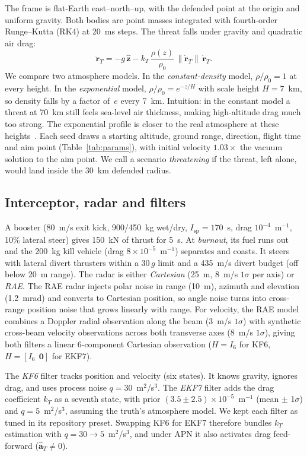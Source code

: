 \documentclass[conference,letterpaper]{IEEEtran}
\newcommand{\vect}[1]{\mathbf{#1}}
\begin{document}
The frame is flat-Earth east--north--up, with the defended point at the origin and uniform gravity.
Both bodies are point masses integrated with fourth-order Runge--Kutta (RK4) at 20~ms steps.
The threat falls under gravity and quadratic air drag:
\begin{equation}
\ddot{\vect r}_T = -g\,\hat{\vect z} - k_T\,\frac{\rho(z)}{\rho_0}\,\lVert\dot{\vect r}_T\rVert\,\dot{\vect r}_T .
\label{eq:threat}
\end{equation}
We compare two atmosphere models.
In the \emph{constant-density} model, $\rho/\rho_0 = 1$ at every height.
In the \emph{exponential} model, $\rho/\rho_0 = e^{-z/H}$ with scale height $H = 7$~km, so density falls by a factor of~$e$ every 7~km.
Intuition: in the constant model a threat at 70~km still feels sea-level air thickness, making high-altitude drag much too strong.
The exponential profile is closer to the real atmosphere at these heights~\cite{ussa1976}.
Each seed draws a starting altitude, ground range, direction, flight time and aim point (Table~\ref{tab:params}), with initial velocity $1.03\times$ the vacuum solution to the aim point.
We call a scenario \emph{threatening} if the threat, left alone, would land inside the 30~km defended radius.

\subsection{Interceptor, radar and filters}

A booster (80~m/s exit kick, 900/450~kg wet/dry, $I_{\mathrm{sp}} = 170$~s, drag $10^{-4}$~m$^{-1}$, 10\% lateral steer) gives 150~kN of thrust for 5~s.
At \emph{burnout}, its fuel runs out and the 200~kg kill vehicle (drag $8\times10^{-5}$~m$^{-1}$) separates and coasts.
It steers with lateral divert thrusters within a 30\,$g$ limit and a 435~m/s divert budget (off below 20~m range).
The radar is either \emph{Cartesian} (25~m, 8~m/s $1\sigma$ per axis) or \emph{RAE}.
The RAE radar injects polar noise in range (10~m), azimuth and elevation (1.2~mrad) and converts to Cartesian position, so angle noise turns into cross-range position noise that grows linearly with range.
For velocity, the RAE model combines a Doppler radial observation along the beam (3~m/s $1\sigma$) with synthetic cross-beam velocity observations across both transverse axes (8~m/s $1\sigma$), giving both filters a linear 6-component Cartesian observation ($H = I_6$ for KF6, $H = [I_6\;\,\vect 0]$ for EKF7).

The \emph{KF6} filter tracks position and velocity (six states).
It knows gravity, ignores drag, and uses process noise $q = 30$~m$^2$/s$^3$.
The \emph{EKF7} filter adds the drag coefficient $k_T$ as a seventh state, with prior $(3.5\pm2.5)\times10^{-5}$~m$^{-1}$ (mean $\pm$ 1$\sigma$) and $q = 5$~m$^2$/s$^3$, assuming the truth's atmosphere model.
We kept each filter as tuned in its repository preset.
Swapping KF6 for EKF7 therefore bundles $k_T$ estimation with $q = 30 \to 5$~m$^2$/s$^3$, and under APN it also activates drag feed-forward ($\hat{\vect a}_T \neq 0$).
\end{document}
